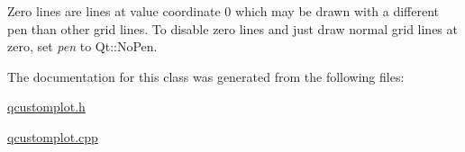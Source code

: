 Zero lines are lines at value coordinate 0 which may be drawn with a different pen than other grid lines. To disable zero lines and just draw normal grid lines at zero, set {\itshape pen} to Qt\+::\+No\+Pen. 

The documentation for this class was generated from the following files\+:\begin{DoxyCompactItemize}
\item 
\hyperlink{qcustomplot_8h}{qcustomplot.\+h}\item 
\hyperlink{qcustomplot_8cpp}{qcustomplot.\+cpp}\end{DoxyCompactItemize}
